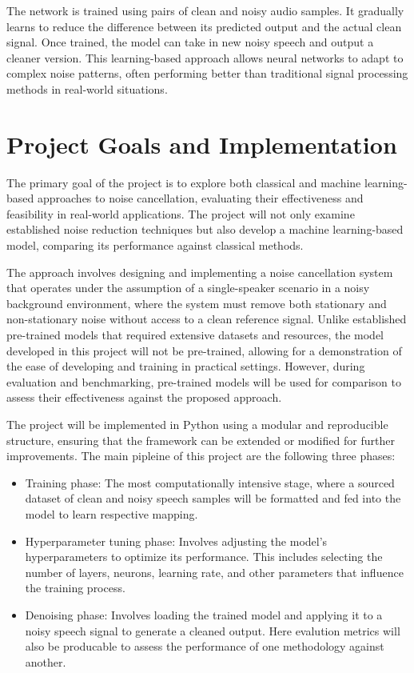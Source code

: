 The network is trained using pairs of clean and noisy audio samples. It gradually learns to reduce the difference between its predicted output and the actual clean signal. Once trained, the model can take in new noisy speech and output a cleaner version. This learning-based approach allows neural networks to adapt to complex noise patterns, often performing better than traditional signal processing methods in real-world situations.

\section{Project Goals and Implementation}

The primary goal of the project is to explore both classical and machine learning-based approaches to noise cancellation, evaluating their effectiveness and feasibility in real-world applications. The project will not only examine established noise reduction techniques but also develop a machine learning-based model, comparing its performance against classical methods.

The approach involves designing and implementing a noise cancellation system that operates under the assumption of a single-speaker scenario in a noisy background environment, where the system must remove both stationary and non-stationary noise without access to a clean reference signal. Unlike established pre-trained models that required extensive datasets and resources, the model developed in this project will not be pre-trained, allowing for a demonstration of the ease of developing and training in practical settings. However, during evaluation and benchmarking, pre-trained models will be used for comparison to assess their effectiveness against the proposed approach.

The project will be implemented in Python using a modular and reproducible structure, ensuring that the framework can be extended or modified for further improvements. The main pipleine of this project are the following three phases:
\begin{itemize}
    \item Training phase: The most computationally intensive stage, where a sourced dataset of clean and noisy speech samples will be formatted and fed into the model to learn respective mapping.
    \item Hyperparameter tuning phase: Involves adjusting the model's hyperparameters to optimize its performance. This includes selecting the number of layers, neurons, learning rate, and other parameters that influence the training process.
    \item Denoising phase: Involves loading the trained model and applying it to a noisy speech signal to generate a cleaned output. Here evalution metrics will also be producable to assess the performance of one methodology against another.
\end{itemize}

